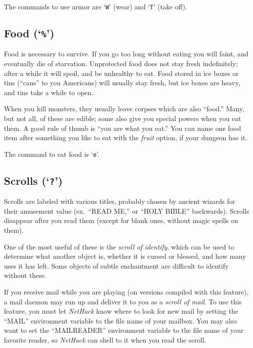 The commands to use armor are `{\tt W}' (wear) and `{\tt T}' (take off).

\subsection*{Food (`{\tt \%}')}

Food is necessary to survive.  If you go too long without eating you
will faint, and eventually die of starvation.  Unprotected food does
not stay fresh indefinitely; after a while it will spoil, and be
unhealthy to eat.  Food stored in ice boxes or tins (``cans'' to you
Americans) will usually stay fresh, but ice boxes are heavy, and tins
take a while to open.

When you kill monsters, they usually leave corpses which are also
``food.''  Many, but not all, of these are edible; some also give you
special powers when you eat them.  A good rule of thumb is ``you are
what you eat.''
You can name one food item after something you like to eat with the
{\it fruit\/} option, if your dungeon has it.

The command to eat food is `{\tt e}'.

\subsection*{Scrolls (`{\tt ?}')}

Scrolls are labeled with various titles, probably chosen by ancient wizards
for their amusement value (ex.\ ``READ ME,'' or ``HOLY BIBLE'' backwards).
Scrolls disappear after you read them (except for blank ones, without
magic spells on them).

One of the most useful of these is the %
{\it scroll of identify}, which
can be used to determine what another object is, whether it is cursed or
blessed, and how many uses it has left.  Some objects of subtle
enchantment are difficult to identify without these.

If you receive mail while you are playing (on
versions compiled with this feature), a mail daemon may run up and
deliver it to you as a %
{\it scroll of mail}.  To use this feature,
you must let {\it NetHack\/} know where to look for new mail by setting the
``MAIL'' environment variable to the file name of your mailbox.  You
may also want to set the ``MAILREADER'' environment variable to the
file name of your favorite reader, so {\it NetHack\/} can shell to it when you
read the scroll.

